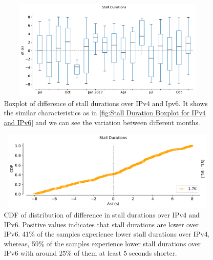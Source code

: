 \begin{figure}[!ht]
	\centering
	\includegraphics[keepaspectratio, height=5cm, width=15cm]{figures/stall/netflix-stall-durations-diff-box.pdf}
	\caption[Boxplot of difference of stall durations over IPv4 and IPv6]{Boxplot of difference of stall durations over IPv4 and Ipv6. It shows the similar characteristics as in \cref{fig:Stall Duration Boxplot for IPv4 and IPv6} and we can see the variation between different months.}
	\label{fig:Stall Duration Difference Boxplot}
\end{figure}
\begin{figure}[!ht]
	\centering
	\includegraphics[keepaspectratio, height=4cm, width=15cm]{figures/stall/netflix-stall-durations-absolute-difference.pdf}
	\caption[CDF of difference of stall durations over IPv4 and IPv6]{CDF of distribution of difference in stall durations over IPv4 and IPv6. 
	Positive values indicates that stall durations are lower over IPv6. 41\% of the samples experience lower stall durations over IPv4, whereas, 59\% of the samples experience lower stall durations over IPv6 with around 25\% of them at least 5 seconds shorter.}
	\label{fig:Stall Duration CDF}
\end{figure}

\FloatBarrier